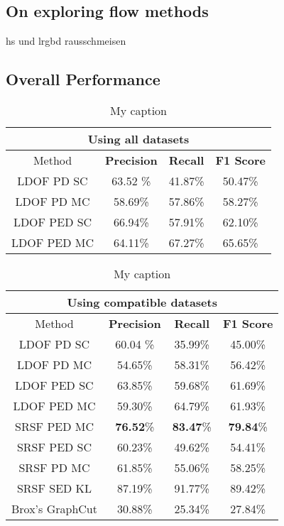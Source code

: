 \subsection{On exploring flow methods}
hs und lrgbd rausschmeisen

\subsection{Overall Performance}



\begin{table}[H]
\centering
\begin{tabular}{|c|c|c|c|}
\hline
\multicolumn{4}{|c|}{Using all datasets}                        \\ \hline
Method & \textbf{Precision} & \textbf{Recall} & \textbf{F1 Score} \\ \hline
LDOF PD SC & 63.52 \%   & 41.87\%     & 50.47\%  \\ \hline
LDOF PD MC & 58.69\%   & 57.86\%     & 58.27\%  \\ \hline
LDOF PED SC & 66.94\%   & 57.91\%     & 62.10\%  \\ \hline
LDOF PED MC & 64.11\%   & 67.27\%     & 65.65\%  \\ \hline                 
\end{tabular}
\caption[Overall Performance]{My caption}
\label{tab:overall_performance}
\end{table}


\begin{table}[H]
\centering
\begin{tabular}{|c|c|c|c|}
\hline
\multicolumn{4}{|c|}{Using compatible datasets}                        \\ \hline
Method & \textbf{Precision} & \textbf{Recall} & \textbf{F1 Score} \\ \hline
LDOF PD SC & 60.04 \%   & 35.99\%     & 45.00\%  \\ \hline
LDOF PD MC & 54.65\%   & 58.31\%     & 56.42\%  \\ \hline
LDOF PED SC & 63.85\%   & 59.68\%     & 61.69\%  \\ \hline
LDOF PED MC & 59.30\%   & 64.79\%     & 61.93\%  \\ \hline
SRSF PED MC & \textbf{76.52}\%   & \textbf{83.47}\%     & \textbf{79.84}\%  \\ \hline
SRSF PED SC & 60.23\%   & 49.62\%     & 54.41\%  \\ \hline 
SRSF PD MC & 61.85\%   & 55.06\%     & 58.25\%  \\ \hline
SRSF SED KL & 87.19\%   & 91.77\%     & 89.42\%  \\ \hline
Brox's GraphCut & 30.88\%   & 25.34\%     & 27.84\%  \\ \hline                   
\end{tabular}
\caption[Overall Performance]{My caption}
\label{tab:overall_performance}
\end{table}



